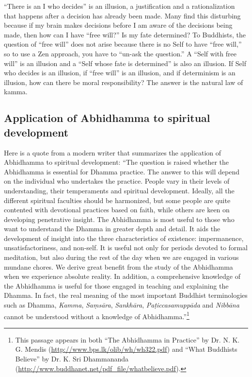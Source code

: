 “There is an I who decides” is an illusion, a justification and a rationalization that happens after a decision has already been made. Many find this disturbing because if my brain makes decisions before I am aware of the decisions being made, then how can I have “free will?” Is my fate determined? To Buddhists, the question of “free will” does not arise because there is no Self to have “free will,” so to use a Zen approach, you have to “un-ask the question.” A “Self with free will” is an illusion and a “Self whose fate is determined” is also an illusion. If Self who decides is an illusion, if “free will” is an illusion, and if determinism is an illusion, how can there be moral responsibility? The answer is the natural law of kamma.

\pagebreak

\subsection*{Application of Abhidhamma to spiritual development}

Here is a quote from a modern writer that summarizes the application of Abhidhamma to spiritual development: “The question is raised whether the Abhidhamma is essential for Dhamma practice. The answer to this will depend on the individual who undertakes the practice. People vary in their levels of understanding, their temperaments and spiritual development. Ideally, all the different spiritual faculties should be harmonized, but some people are quite contented with devotional practices based on faith, while others are keen on developing penetrative insight. The Abhidhamma is most useful to those who want to understand the Dhamma in greater depth and detail. It aids the development of insight into the three characteristics of existence: impermanence, unsatisfactoriness, and non-self. It is useful not only for periods devoted to formal meditation, but also during the rest of the day when we are engaged in various mundane chores. We derive great benefit from the study of the Abhidhamma when we experience absolute reality. In addition, a comprehensive knowledge of the Abhidhamma is useful for those engaged in teaching and explaining the Dhamma. In fact, the real meaning of the most important Buddhist terminologies such as Dhamma, \textit{Kamma}, \textit{Saṃsāra}, \textit{Sankhāra}, \textit{Paṭiccasamuppāda} and \textit{Nibbāna} cannot be understood without a knowledge of Abhidhamma.”\footnote{This passage appears in both “The Abhidhamma in Practice” by Dr. N. K. G. Mendis (\url{http://www.bps.lk/olib/wh/wh322.pdf}) and “What Buddhists Believe” by Dr. K. Sri Dhammananda (\url{http://www.buddhanet.net/pdf_file/whatbelieve.pdf}).}

